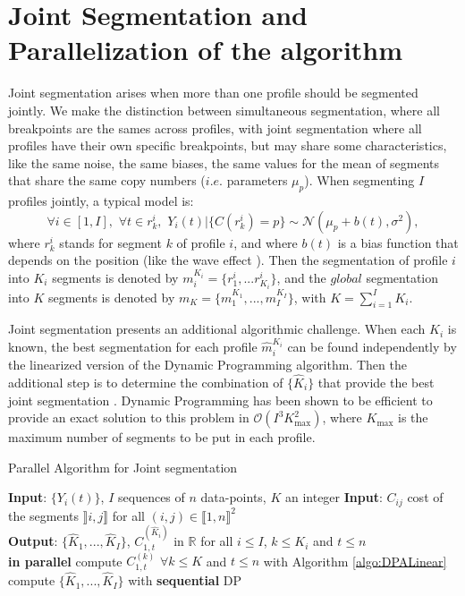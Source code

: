 \documentclass{llncs}
\begin{document}
\section{Joint Segmentation and Parallelization of the algorithm}

Joint segmentation arises when more than one profile should be segmented jointly. We make the distinction between simultaneous segmentation, where all breakpoints are the sames across profiles, with joint segmentation where all profiles have their own specific breakpoints, but may share some characteristics, like the same noise, the same biases, the same values for the mean of segments that share the same copy numbers ($i.e.$ parameters $\mu_p$). When segmenting $I$ profiles jointly, a typical model is: 
$$
\forall i \in [1,I],\,\, \forall t \in r_k^i, \,\, Y_i(t)|\{C(r_k^i)=p\} \sim \mathcal{N}(\mu_p+b(t),\sigma^2),
$$
where ${r_k^i}$ stands for segment $k$ of profile $i$, and where $b(t)$ is a bias function that depends on the position (like the wave effect \cite{PLH11}). Then the segmentation of profile $i$ into $K_i$ segments is denoted by $m_{i}^{K_i}=\{r_1^i,...r_{K_i}^i\}$, and the $global$ segmentation into $K$ segments is denoted by $m_K=\{m_1^{K_1}, ..., m_{I}^{K_I}\}$, with $K=\sum_{i=1}^I K_i$.

Joint segmentation presents an additional algorithmic challenge. When each $K_i$ is known, the best segmentation for each profile $\widehat{m}_{i}^{K_i}$ can be found independently by the linearized version of the Dynamic Programming algorithm. Then the additional step is to determine the combination of $\{\widehat{K}_i\}$ that provide the best joint segmentation \cite{PLH11}. Dynamic Programming has been shown to be efficient to provide an exact solution to this problem in $\mathcal{O}(I^3 K_{\max}^2)$, where $K_{\max}$ is the maximum number of segments to be put in each profile. 



\begin{algorithm}
\begin{algorithmic}
\caption{Parallel Algorithm for Joint segmentation}\label{algo:parallelDP}
\State \textbf{Input}: $\{Y_i(t)\}$, $I$ sequences of $n$ data-points, $K$ an integer 
\State \textbf{Input}: $C_{ij}$ cost of the segments $\rrbracket i, j \rrbracket$  for all $(i, j) \in \llbracket1, n \rrbracket^2$\\
\State \textbf{Output}:  $\{\widehat{K}_1,..., \widehat{K}_I\}$, $C^{(\widehat{K}_i)}_{1,t}$ in $\mathbb{R}$ for all $i \leq I$, $k \leq K_i$ and $t \leq n$ \\
 {\bf in parallel}
\State compute $C^{(k)}_{1,t}$  $\forall k \leq K$ and $t \leq n$ with Algorithm \ref{algo:DPALinear}
\EndFor
\State compute $\{\widehat{K}_1,..., \widehat{K}_I\}$ with {\bf sequential} DP \cite{PLH11}
\EndWhile
  \end{algorithmic}
\end{algorithm}
\end{document}
